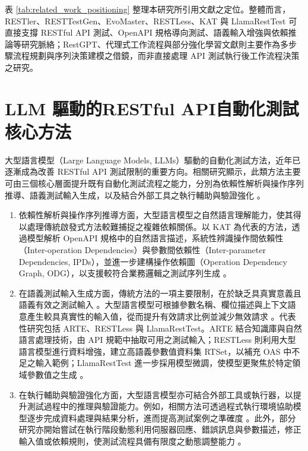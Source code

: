 \begin{ZhChapter}
\text 表 \ref{tab:related_work_positioning} 整理本研究所引用文獻之定位。整體而言，RESTler、RESTTestGen、EvoMaster、RESTLess、KAT 與 LlamaRestTest 可直接支撐 RESTful API 測試、OpenAPI 規格導向測試、語義輸入增強與依賴推論等研究脈絡；RestGPT、代理式工作流程與部分強化學習文獻則主要作為多步驟流程規劃與序列決策建模之借鏡，而非直接處理 API 測試執行後工作流程決策之研究。

\section{LLM 驅動的RESTful API自動化測試核心方法}
\text 大型語言模型（Large Language Models, LLMs）驅動的自動化測試方法，近年已逐漸成為改善 RESTful API 測試限制的重要方向。相關研究顯示，此類方法主要可由三個核心層面提升既有自動化測試流程之能力，分別為依賴性解析與操作序列推導、語義測試輸入生成，以及結合外部工具之執行輔助與驗證強化 \parencite{Nguyen2024KAT}。

\begin{enumerate}
    \item \text 依賴性解析與操作序列推導方面，大型語言模型之自然語言理解能力，使其得以處理傳統啟發式方法較難捕捉之複雜依賴關係。以 KAT 為代表的方法，透過模型解析 OpenAPI 規格中的自然語言描述，系統性辨識操作間依賴性（Inter-operation Dependencies）與參數間依賴性（Inter-parameter Dependencies, IPDs），並進一步建構操作依賴圖（Operation Dependency Graph, ODG），以支援較符合業務邏輯之測試序列生成 \parencite{Nguyen2024KAT}。
    
    \item \text 在語義測試輸入生成方面，傳統方法的一項主要限制，在於缺乏具真實意義且語義有效之測試輸入 \parencite{Alonso2023ARTE}。大型語言模型可根據參數名稱、欄位描述與上下文語意產生較具真實性的輸入值，從而提升有效請求比例並減少無效請求 \parencite{Anonymous2023LLMGenerators, Alonso2023ARTE}。代表性研究包括 ARTE、RESTLess 與 LlamaRestTest。ARTE 結合知識庫與自然語言處理技術，由 API 規範中抽取可用之測試輸入；RESTLess 則利用大型語言模型進行資料增強，建立高語義參數值資料集 RTSet，以補充 OAS 中不足之輸入範例；LlamaRestTest 進一步採用模型微調，使模型更聚焦於特定領域參數值之生成 \parencite{Alonso2023ARTE, Zheng2024RESTLess, Kim2025LlamaRestTest}。
    
    \item \text 在執行輔助與驗證強化方面，大型語言模型亦可結合外部工具或執行器，以提升測試過程中的推理與驗證能力。例如，相關方法可透過程式執行環境協助模型逐步完成資料處理與結果分析，進而提高測試案例之準確度 \parencite{Wang2020AutomaticGeneration}。此外，部分研究亦開始嘗試在執行階段動態利用伺服器回應、錯誤訊息與參數描述，修正輸入值或依賴規則，使測試流程具備有限度之動態調整能力 \parencite{Kim2025LlamaRestTest}。
\end{enumerate}


\end{ZhChapter}
